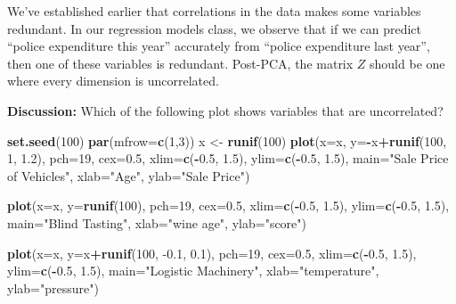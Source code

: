 \documentclass[]{article}
\newenvironment{Shaded}{\begin{snugshade}}{\end{snugshade}}
\newcommand{\DataTypeTok}[1]{\textcolor[rgb]{0.13,0.29,0.53}{#1}}
\newcommand{\DecValTok}[1]{\textcolor[rgb]{0.00,0.00,0.81}{#1}}
\newcommand{\FloatTok}[1]{\textcolor[rgb]{0.00,0.00,0.81}{#1}}
\newcommand{\KeywordTok}[1]{\textcolor[rgb]{0.13,0.29,0.53}{\textbf{#1}}}
\newcommand{\NormalTok}[1]{#1}
\newcommand{\OperatorTok}[1]{\textcolor[rgb]{0.81,0.36,0.00}{\textbf{#1}}}
\newcommand{\StringTok}[1]{\textcolor[rgb]{0.31,0.60,0.02}{#1}}
\begin{document}
We've established earlier that correlations in the data makes some
variables redundant. In our regression models class, we observe that if
we can predict ``police expenditure this year'' accurately from ``police
expenditure last year'', then one of these variables is redundant.
Post-PCA, the matrix \(Z\) should be one where every dimension is
uncorrelated.

\textbf{Discussion:} Which of the following plot shows variables that
are uncorrelated?

\begin{Shaded}
\begin{Highlighting}[]
\KeywordTok{set.seed}\NormalTok{(}\DecValTok{100}\NormalTok{)}
\KeywordTok{par}\NormalTok{(}\DataTypeTok{mfrow=}\KeywordTok{c}\NormalTok{(}\DecValTok{1}\NormalTok{,}\DecValTok{3}\NormalTok{))}
\NormalTok{x <-}\StringTok{ }\KeywordTok{runif}\NormalTok{(}\DecValTok{100}\NormalTok{)}
\KeywordTok{plot}\NormalTok{(}\DataTypeTok{x=}\NormalTok{x, }\DataTypeTok{y=}\OperatorTok{-}\NormalTok{x}\OperatorTok{+}\KeywordTok{runif}\NormalTok{(}\DecValTok{100}\NormalTok{, }\DecValTok{1}\NormalTok{, }\FloatTok{1.2}\NormalTok{), }\DataTypeTok{pch=}\DecValTok{19}\NormalTok{, }\DataTypeTok{cex=}\FloatTok{0.5}\NormalTok{, }\DataTypeTok{xlim=}\KeywordTok{c}\NormalTok{(}\OperatorTok{-}\FloatTok{0.5}\NormalTok{, }\FloatTok{1.5}\NormalTok{), }\DataTypeTok{ylim=}\KeywordTok{c}\NormalTok{(}\OperatorTok{-}\FloatTok{0.5}\NormalTok{, }\FloatTok{1.5}\NormalTok{), }\DataTypeTok{main=}\StringTok{"Sale Price of Vehicles"}\NormalTok{, }\DataTypeTok{xlab=}\StringTok{"Age"}\NormalTok{, }\DataTypeTok{ylab=}\StringTok{"Sale Price"}\NormalTok{)}

\KeywordTok{plot}\NormalTok{(}\DataTypeTok{x=}\NormalTok{x, }\DataTypeTok{y=}\KeywordTok{runif}\NormalTok{(}\DecValTok{100}\NormalTok{), }\DataTypeTok{pch=}\DecValTok{19}\NormalTok{, }\DataTypeTok{cex=}\FloatTok{0.5}\NormalTok{, }\DataTypeTok{xlim=}\KeywordTok{c}\NormalTok{(}\OperatorTok{-}\FloatTok{0.5}\NormalTok{, }\FloatTok{1.5}\NormalTok{), }\DataTypeTok{ylim=}\KeywordTok{c}\NormalTok{(}\OperatorTok{-}\FloatTok{0.5}\NormalTok{, }\FloatTok{1.5}\NormalTok{), }\DataTypeTok{main=}\StringTok{"Blind Tasting"}\NormalTok{, }\DataTypeTok{xlab=}\StringTok{"wine age"}\NormalTok{, }\DataTypeTok{ylab=}\StringTok{"score"}\NormalTok{)}

\KeywordTok{plot}\NormalTok{(}\DataTypeTok{x=}\NormalTok{x, }\DataTypeTok{y=}\NormalTok{x}\OperatorTok{+}\KeywordTok{runif}\NormalTok{(}\DecValTok{100}\NormalTok{, }\FloatTok{-0.1}\NormalTok{, }\FloatTok{0.1}\NormalTok{), }\DataTypeTok{pch=}\DecValTok{19}\NormalTok{, }\DataTypeTok{cex=}\FloatTok{0.5}\NormalTok{, }\DataTypeTok{xlim=}\KeywordTok{c}\NormalTok{(}\OperatorTok{-}\FloatTok{0.5}\NormalTok{, }\FloatTok{1.5}\NormalTok{), }\DataTypeTok{ylim=}\KeywordTok{c}\NormalTok{(}\OperatorTok{-}\FloatTok{0.5}\NormalTok{, }\FloatTok{1.5}\NormalTok{), }\DataTypeTok{main=}\StringTok{"Logistic Machinery"}\NormalTok{, }\DataTypeTok{xlab=}\StringTok{"temperature"}\NormalTok{, }\DataTypeTok{ylab=}\StringTok{"pressure"}\NormalTok{)}
\end{Highlighting}
\end{Shaded}
\end{document}
